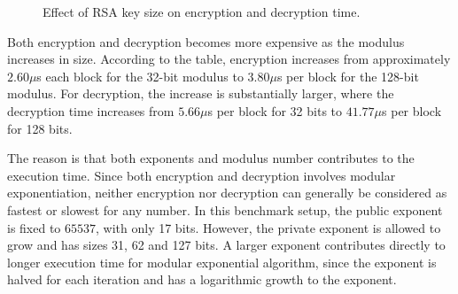 \documentclass[11pt,a4paper]{article}
\begin{document}
\begin{figure}[ht]
    \centering

    \caption{Effect of RSA key size on encryption and decryption time.}
    \label{fig:key-scale-time}
\end{figure}

Both encryption and decryption becomes more expensive as the modulus increases in size. According to the table, encryption increases from approximately $2.60 \mu$s each block for the 32-bit modulus to $3.80 \mu$s per block for the 128-bit modulus. For decryption, the increase is substantially larger, where the decryption time increases from $5.66 \mu$s per block for 32 bits to $41.77 \mu$s per block for 128 bits.

The reason is that both exponents and modulus number contributes to the execution time. Since both encryption and decryption involves modular exponentiation, neither encryption nor decryption can generally be considered as fastest or slowest for any number. In this benchmark setup, the public exponent is fixed to $65537$, with only 17 bits. However, the private exponent is allowed to grow and has sizes 31, 62 and 127 bits. A larger exponent contributes directly to longer execution time for modular exponential algorithm, since the exponent is halved for each iteration and has a logarithmic growth to the exponent.
\end{document}
